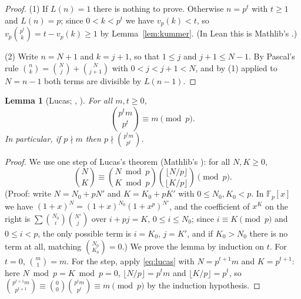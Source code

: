 \documentclass[11pt]{amsart}
\theoremstyle{plain}
\newtheorem{lemma}[theorem]{Lemma}
\theoremstyle{definition}
\begin{document}
\begin{proof}
(1) If $L(n)=1$ there is nothing to prove. Otherwise $n=p^t$ with $t\ge1$ and $L(n)=p$; since $0<k<p^t$ we have $v_p(k)<t$, so $v_p\binom{p^t}k=t-v_p(k)\ge1$ by Lemma~\ref{lem:kummer}. (In Lean this is Mathlib's .)

(2) Write $n=N+1$ and $k=j+1$, so that $1\le j$ and $j+1\le N-1$. By Pascal's rule $\binom nk=\binom Nj+\binom N{j+1}$ with $0<j<j+1<N$, and by (1) applied to $N=n-1$ both terms are divisible by $L(n-1)$.
\end{proof}

\begin{lemma}[Lucas; , ]\label{lem:lucas}
For all $m,t\ge0$,
\[
  \binom{p^tm}{p^t}\equiv m\pmod p.
\]
In particular, if $p\nmid m$ then $p\nmid\binom{p^tm}{p^t}$.
\end{lemma}

\begin{proof}
We use one step of Lucas's theorem \cite{Lucas} (Mathlib's ): for all $N,K\ge0$,
\begin{equation}\label{eq:lucas}
  \binom NK\equiv\binom{N\bmod p}{K\bmod p}\binom{\lfloor N/p\rfloor}{\lfloor K/p\rfloor}\pmod p .
\end{equation}
(Proof: write $N=N_0+pN'$ and $K=K_0+pK'$ with $0\le N_0,K_0<p$. In $\mathbb F_p[x]$ we have $(1+x)^N=(1+x)^{N_0}(1+x^p)^{N'}$, and the coefficient of $x^K$ on the right is $\sum\binom{N_0}{i}\binom{N'}{j}$ over $i+pj=K$, $0\le i\le N_0$; since $i\equiv K\pmod p$ and $0\le i<p$, the only possible term is $i=K_0$, $j=K'$, and if $K_0>N_0$ there is no term at all, matching $\binom{N_0}{K_0}=0$.)
We prove the lemma by induction on $t$. For $t=0$, $\binom m1=m$. For the step, apply \eqref{eq:lucas} with $N=p^{t+1}m$ and $K=p^{t+1}$: here $N\bmod p=K\bmod p=0$, $\lfloor N/p\rfloor=p^tm$ and $\lfloor K/p\rfloor=p^t$, so $\binom{p^{t+1}m}{p^{t+1}}\equiv\binom00\binom{p^tm}{p^t}\equiv m\pmod p$ by the induction hypothesis.
\end{proof}
\end{document}
